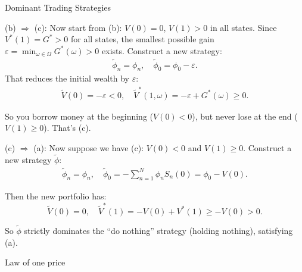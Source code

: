 \documentclass{beamer}
\begin{document}
\begin{frame}{Dominant Trading Strategies}

    {\footnotesize \footnotesize
    \par  (b) \(\Rightarrow\) (c): Now start from (b): \( V(0) = 0 \), \( V(1) > 0 \) in all states.
    Since \( V^*(1) = G^* > 0 \) for all states, the smallest possible gain $\varepsilon = \min_{\omega \in \Omega} G^*(\omega) > 0$
    exists. Construct a new strategy:
    \vspace{-1em}
    \begin{align*}
        \tilde{\phi}_n = \phi_n, \quad \tilde{\phi}_0 = \phi_0 - \varepsilon.
    \end{align*}
    That reduces the initial wealth by \(\varepsilon\):
    \begin{align*}
        \tilde{V}(0) = -\varepsilon < 0, \quad \tilde{V}^*(1, \omega) = -\varepsilon + G^*(\omega) \geq 0.
    \end{align*}
    \par So you borrow money at the beginning (\(V(0) < 0\)), but never lose at the end (\(V(1) \geq 0\)). That's (c).
    \par (c) $\Rightarrow$ (a): Now suppose we have (c): \( V(0) < 0 \) and \( V(1) \geq 0 \). 
    Construct a new strategy \(\tilde{\phi}\):
    \vspace{-1em}
    \begin{align*}
        \tilde{\phi}_n = \phi_n, \quad \tilde{\phi}_0 = -\sum_{n=1}^{N} \phi_n S_n(0) = \phi_0 - V(0).
    \end{align*}
    \vspace{-1em}
    \par Then the new portfolio has:
%
\[
\tilde{V}(0) = 0, \quad \tilde{V}^*(1) = -V(0) + V^*(1) \geq -V(0) > 0.
\]
\par So \(\tilde{\phi}\) strictly dominates the ``do nothing'' strategy (holding nothing), satisfying (a).
    }
\end{frame}

\begin{frame}{Law of one price}

    {\footnotesize \footnotesize
    



    }
\end{frame}


    
\end{document}
